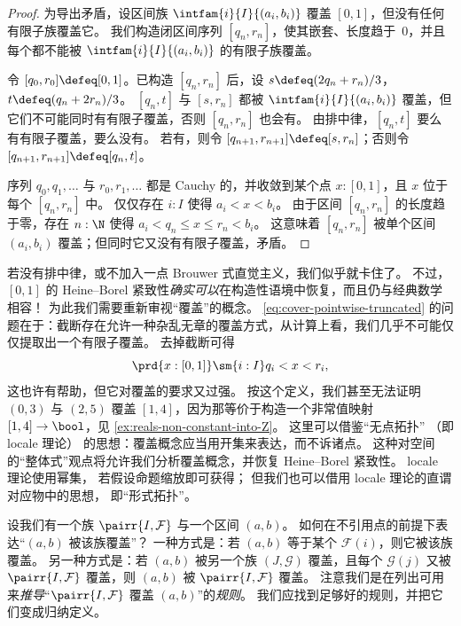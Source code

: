 \begin{proof}
  为导出矛盾，设区间族 $\intfam{i}{I}{(a_i,
    b_i)}$ 覆盖 $[0,1]$，但没有任何有限子族覆盖它。
  我们构造闭区间序列 $[q_n, r_n]$，使其嵌套、长度趋于~$0$，并且每个都不能被 $\intfam{i}{I}{(a_i, b_i)}$ 的有限子族覆盖。

  令 $[q_0, r_0] \defeq [0,1]$。已构造 $[q_n, r_n]$ 后，设
  $s \defeq (2 q_n + r_n)/3$，$t \defeq (q_n + 2 r_n)/3$。
  $[q_n, t]$ 与 $[s, r_n]$ 都被 $\intfam{i}{I}{(a_i, b_i)}$ 覆盖，但它们不可能同时有有限子覆盖，否则 $[q_n, r_n]$ 也会有。
  由排中律，$[q_n, t]$ 要么有有限子覆盖，要么没有。
  若有，则令 $[q_{n+1}, r_{n+1}] \defeq [s, r_n]$；否则令 $[q_{n+1},
  r_{n+1}] \defeq [q_n, t]$。

  序列 $q_0, q_1, \ldots$ 与 $r_0, r_1, \ldots$ 都是 Cauchy 的，并收敛到某个点 $x : [0,1]$，且 $x$ 位于每个 $[q_n, r_n]$ 中。
  仅仅存在 $i : I$ 使得 $a_i < x < b_i$。
  由于区间 $[q_n, r_n]$ 的长度趋于零，存在 $n : \N$ 使得 $a_i < q_n \leq x
  \leq r_n < b_i$。
  这意味着 $[q_n, r_n]$ 被单个区间 $(a_i,
  b_i)$ 覆盖；但同时它又没有有限子覆盖，矛盾。
\end{proof}

若没有排中律，或不加入一点 Brouwer 式直觉主义，我们似乎就卡住了。
不过，$[0,1]$ 的 Heine--Borel 紧致性\emph{确实可以}在构造性语境中恢复，而且仍与经典数学相容！
为此我们需要重新审视“覆盖”的概念。
\eqref{eq:cover-pointwise-truncated} 的问题在于：截断存在允许一种杂乱无章的覆盖方式，从计算上看，我们几乎不可能仅仅提取出一个有限子覆盖。
去掉截断可得
%
\begin{equation} \label{eq:cover-pointwise}
  \prd{x : [0,1]} \sm{i : I} q_i < x < r_i,
\end{equation}
%
这也许有帮助，但它对覆盖的要求又过强。
按这个定义，我们甚至无法证明 $(0,3)$ 与 $(2,5)$ 覆盖 $[1,4]$，因为那等价于构造一个非常值映射 $[1,4] \to \bool$，见
\cref{ex:reals-non-constant-into-Z}。
这里可以借鉴“无点拓扑”%
%
（即 locale 理论）%
的思想：覆盖概念应当用开集来表达，而不诉诸点。
这种对空间的“整体式”观点将允许我们分析覆盖概念，并恢复 Heine--Borel 紧致性。
locale 理论使用幂集，%
若假设命题缩放即可获得；%
但我们也可以借用 locale 理论的直谓对应物中的思想，%
即“形式拓扑”。%


设我们有一个族 $\pairr{I, \mathcal{F}}$ 与一个区间 $(a, b)$。
如何在不引用点的前提下表达“$(a,b)$ 被该族覆盖”？
一种方式是：若 $(a, b)$ 等于某个 $\mathcal{F}(i)$，则它被该族覆盖。
另一种方式是：若 $(a,b)$ 被另一个族 $(J, \mathcal{G})$ 覆盖，且每个 $\mathcal{G}(j)$ 又被 $\pairr{I, \mathcal{F}}$ 覆盖，则 $(a,b)$ 被
$\pairr{I, \mathcal{F}}$ 覆盖。
注意我们是在列出可用来\emph{推导}“$\pairr{I, \mathcal{F}}$ 覆盖 $(a,b)$”的\emph{规则}。
我们应找到足够好的规则，并把它们变成归纳定义。

